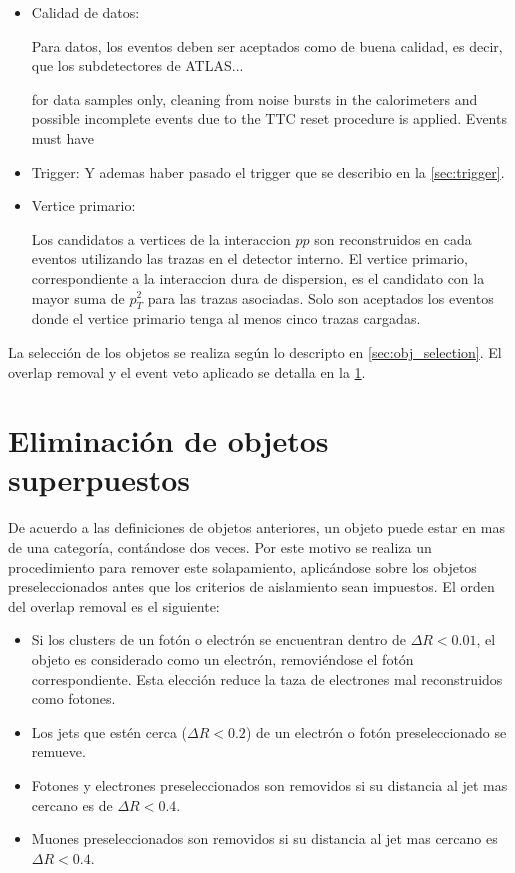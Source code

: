 \begin{itemize}\itemsep0.1cm

\item Calidad de datos:

  Para datos, los eventos deben ser aceptados como de buena calidad, es decir, que
  los subdetectores de ATLAS...



  for data samples only, cleaning from noise bursts in the calorimeters and possible incomplete events due to the TTC reset procedure is applied. Events must
have %

\item Trigger:
  Y ademas haber pasado el trigger que se describio
  en la \cref{sec:trigger}.

\item Vertice primario:

  Los candidatos a vertices de la interaccion $pp$ son reconstruidos en cada eventos utilizando
  las trazas en el detector interno. El vertice primario, correspondiente a la interaccion dura
  de dispersion, es el candidato con la mayor suma de $p_{T}^{2}$ para las trazas asociadas.
  Solo son aceptados los eventos donde el vertice primario tenga al menos cinco trazas cargadas.


\end{itemize}



La selección de los objetos se realiza según lo descripto en \cref{sec:obj_selection}.
El overlap removal y el event veto aplicado se detalla en la \cref{sec:overlap_romoval_event_veto}.


\section{Eliminación de objetos superpuestos} %
\label{sec:overlap_romoval_event_veto}

De acuerdo a las definiciones de objetos anteriores, un objeto puede estar en mas de una
categoría, contándose dos veces. Por este motivo se realiza un procedimiento para remover
este solapamiento, aplicándose sobre los objetos preseleccionados antes que los criterios
de aislamiento sean impuestos. El orden del overlap removal es el siguiente:

\begin{itemize}\itemsep0.1cm
\item Si los clusters de un fotón o electrón se encuentran dentro de $\Delta R < 0.01$,
  el objeto es considerado como un electrón, removiéndose el fotón correspondiente. Esta
  elección reduce la taza de electrones mal reconstruidos como fotones.
\item Los jets que estén cerca ($\Delta R<0.2$) de un electrón o fotón preseleccionado
  se remueve.
\item Fotones y electrones preseleccionados son removidos si su distancia al jet mas
  cercano es de $\Delta R < 0.4$.
\item Muones preseleccionados son removidos si su distancia al jet mas cercano es $\Delta R < 0.4$.
\end{itemize}


